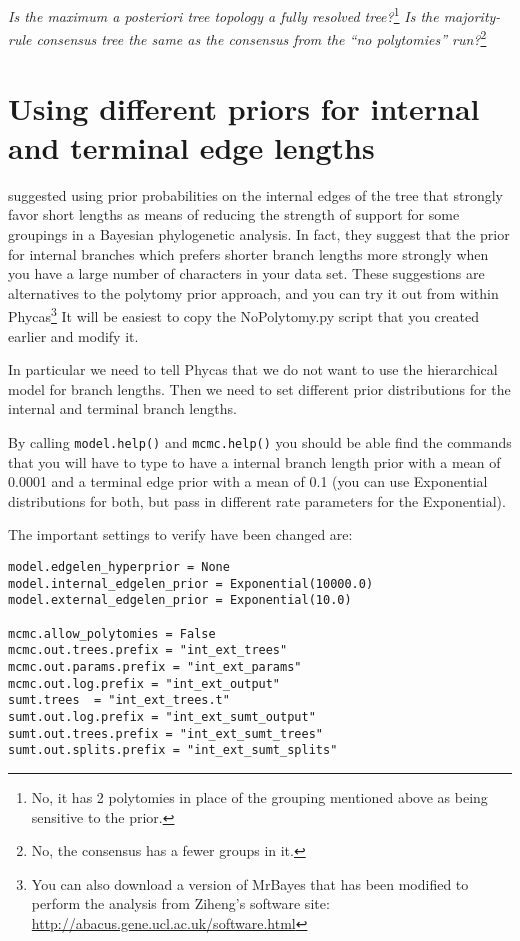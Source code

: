 \documentclass{article}
\newcommand{\cmd}[1]{\texttt{#1}\xspace}
\newcommand{\mb}{MrBayes\xspace}
\newcommand{\phycas}{Phycas\xspace}
\newcommand{\localfile}[1]{\textsf{#1}\xspace}
\newcommand{\QandA}[2]{\textit{#1}\footnote{#2}\xspace}
\begin{document}
\QandA{Is the maximum a posteriori tree topology a fully resolved tree?}{No, it has 2 polytomies in place of the grouping mentioned above as being sensitive to the prior.}
\QandA{Is the majority-rule consensus tree the same as the consensus from the ``no polytomies'' run?}{No, the consensus has a fewer groups in it.}


\section{Using different priors for internal and terminal edge lengths}
\citet{YangR2005} \citep[and][]{Yang2007} suggested using prior probabilities on the internal edges of the tree that strongly favor short lengths as means of reducing the strength
of support for some groupings in a Bayesian phylogenetic analysis.
In fact, they suggest that the prior for internal branches which prefers shorter branch lengths more
strongly when you have a large number of characters in your data set.
These suggestions are alternatives to the polytomy prior approach, and you can try it out from within 
\phycas\footnote{You can also download a version of \mb that has been modified to perform the analysis from Ziheng's software site: \url{http://abacus.gene.ucl.ac.uk/software.html}}
It will be easiest to copy the \localfile{NoPolytomy.py} script that you created earlier 
and modify it.

In particular we need to tell \phycas that we do not want to use the hierarchical model for
branch lengths.
Then we need to set different prior distributions for the internal and terminal branch lengths.

By calling \cmd{model.help()} and \cmd{mcmc.help()} you should be able find the commands that you will have to type to have a internal branch length prior with a mean of 0.0001 and a terminal edge prior with a mean of 0.1 (you can use Exponential distributions for both, but pass in different rate parameters for the Exponential).

The important settings to verify have been changed are:
\begin{verbatim}
model.edgelen_hyperprior = None
model.internal_edgelen_prior = Exponential(10000.0)
model.external_edgelen_prior = Exponential(10.0)

mcmc.allow_polytomies = False
mcmc.out.trees.prefix = "int_ext_trees"
mcmc.out.params.prefix = "int_ext_params"
mcmc.out.log.prefix = "int_ext_output"
sumt.trees  = "int_ext_trees.t"
sumt.out.log.prefix = "int_ext_sumt_output"
sumt.out.trees.prefix = "int_ext_sumt_trees"
sumt.out.splits.prefix = "int_ext_sumt_splits"
\end{verbatim}
\end{document}
